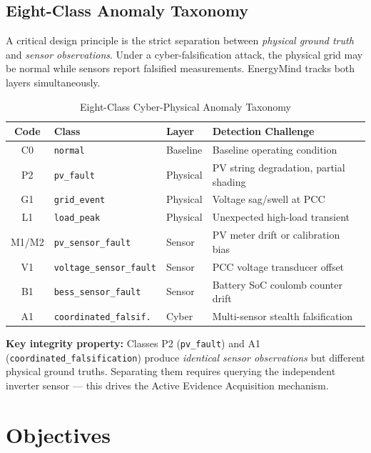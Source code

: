 \documentclass[12pt, a4paper]{article}
\begin{document}
\subsection{Eight-Class Anomaly Taxonomy}

A critical design principle is the strict separation between \emph{physical ground truth} and \emph{sensor observations}. Under a cyber-falsification attack, the physical grid may be normal while sensors report falsified measurements. EnergyMind tracks both layers simultaneously.

\begin{table}[H]
\centering
\caption{Eight-Class Cyber-Physical Anomaly Taxonomy}
\begin{tabularx}{\linewidth}{cllX}
\toprule
\textbf{Code} & \textbf{Class} & \textbf{Layer} & \textbf{Detection Challenge}\\
\midrule
C0 & \texttt{normal} & Baseline & Baseline operating condition\\
P2 & \texttt{pv\_fault} & Physical & PV string degradation, partial shading\\
G1 & \texttt{grid\_event} & Physical & Voltage sag/swell at PCC\\
L1 & \texttt{load\_peak} & Physical & Unexpected high-load transient\\
M1/M2 & \texttt{pv\_sensor\_fault} & Sensor & PV meter drift or calibration bias\\
V1 & \texttt{voltage\_sensor\_fault} & Sensor & PCC voltage transducer offset\\
B1 & \texttt{bess\_sensor\_fault} & Sensor & Battery SoC coulomb counter drift\\
A1 & \texttt{coordinated\_falsif.} & Cyber & Multi-sensor stealth falsification\\
\bottomrule
\end{tabularx}
\end{table}

\begin{tcolorbox}[warnbox]
\small\textbf{Key integrity property:} Classes P2 (\texttt{pv\_fault}) and A1 (\texttt{coordinated\_falsification}) produce \emph{identical sensor observations} but different physical ground truths. Separating them requires querying the independent inverter sensor — this drives the Active Evidence Acquisition mechanism.
\end{tcolorbox}

\section{Objectives}
\end{document}
